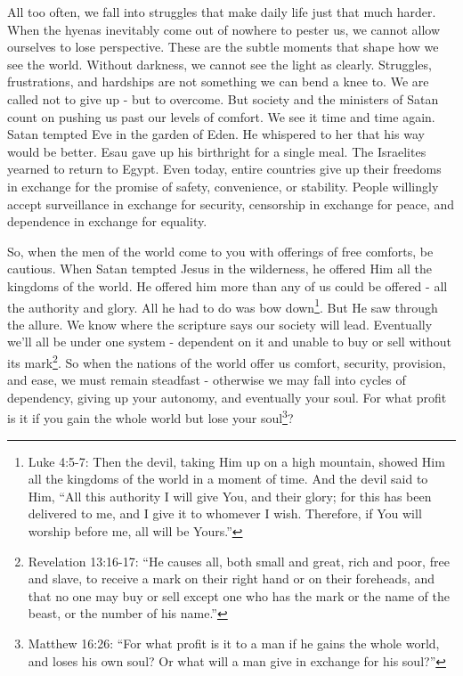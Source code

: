 \documentclass[10pt]{article}
\begin{document}
\begin{multicols}{2}
All too often, we fall into struggles that make daily life just that much harder. When the hyenas inevitably come out of nowhere to pester us, we cannot allow ourselves to lose perspective. These are the subtle moments that shape how we see the world. Without darkness, we cannot see the light as clearly. Struggles, frustrations, and hardships are not something we can bend a knee to. We are called not to give up - but to overcome. But society and the ministers of Satan count on pushing us past our levels of comfort. We see it time and time again. Satan tempted Eve in the garden of Eden. He whispered to her that his way would be better. Esau gave up his birthright for a single meal. The Israelites yearned to return to Egypt. Even today, entire countries give up their freedoms in exchange for the promise of safety, convenience, or stability. People willingly accept surveillance in exchange for security, censorship in exchange for peace, and dependence in exchange for equality.

So, when the men of the world come to you with offerings of free comforts, be cautious. When Satan tempted Jesus in the wilderness, he offered Him all the kingdoms of the world. He offered him more than any of us could be offered - all the authority and glory. All he had to do was bow down\footnote{Luke 4:5-7: Then the devil, taking Him up on a high mountain, showed Him all the kingdoms of the world in a moment of time. And the devil said to Him, ``All this authority I will give You, and their glory; for this has been delivered to me, and I give it to whomever I wish. Therefore, if You will worship before me, all will be Yours.''}. But He saw through the allure. We know where the scripture says our society will lead. Eventually we'll all be under one system - dependent on it and unable to buy or sell without its mark\footnote{Revelation 13:16-17: ``He causes all, both small and great, rich and poor, free and slave, to receive a mark on their right hand or on their foreheads, and that no one may buy or sell except one who has the mark or the name of the beast, or the number of his name.''}. So when the nations of the world offer us comfort, security, provision, and ease, we must remain steadfast - otherwise we may fall into cycles of dependency, giving up your autonomy, and eventually your soul. For what profit is it if you gain the whole world but lose your soul\footnote{Matthew 16:26: ``For what profit is it to a man if he gains the whole world, and loses his own soul? Or what will a man give in exchange for his soul?''}?


\end{multicols}
\end{document}

